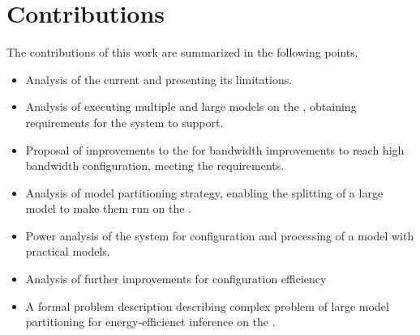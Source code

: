 \section{Contributions}
The contributions of this work are summarized in the following points.

\begin{itemize}
    \item 
    Analysis of the current \confignoc{} and presenting its limitations.
    \item
    Analysis of executing multiple and large models on the \graicore{}, obtaining requirements for the system to support.
    \item
    Proposal of improvements to the \confignoc{} for bandwidth improvements to reach high bandwidth configuration, meeting the requirements.
    \item
    Analysis of model partitioning strategy, enabling the splitting of a large model to make them run on the \graicore{}.
    \item
    Power analysis of the system for configuration and processing of a model with practical models.
    \item
    Analysis of further improvements for configuration efficiency
    \item
    A formal problem description describing complex problem of large model partitioning for energy-efficienct inference on the \graicore{}.
\end{itemize}

